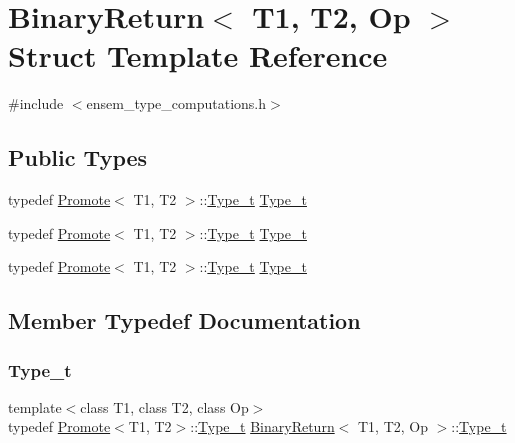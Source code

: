 \hypertarget{structBinaryReturn}{}\section{Binary\+Return$<$ T1, T2, Op $>$ Struct Template Reference}
\label{structBinaryReturn}


{\ttfamily \#include $<$ensem\+\_\+type\+\_\+computations.\+h$>$}

\subsection*{Public Types}
\begin{DoxyCompactItemize}
\item 
typedef \mbox{\hyperlink{structPromote}{Promote}}$<$ T1, T2 $>$\+::\mbox{\hyperlink{structBinaryReturn_a77ba8984fbe3ead3c145da225432d208}{Type\+\_\+t}} \mbox{\hyperlink{structBinaryReturn_a77ba8984fbe3ead3c145da225432d208}{Type\+\_\+t}}
\item 
typedef \mbox{\hyperlink{structPromote}{Promote}}$<$ T1, T2 $>$\+::\mbox{\hyperlink{structBinaryReturn_a77ba8984fbe3ead3c145da225432d208}{Type\+\_\+t}} \mbox{\hyperlink{structBinaryReturn_a77ba8984fbe3ead3c145da225432d208}{Type\+\_\+t}}
\item 
typedef \mbox{\hyperlink{structPromote}{Promote}}$<$ T1, T2 $>$\+::\mbox{\hyperlink{structBinaryReturn_a77ba8984fbe3ead3c145da225432d208}{Type\+\_\+t}} \mbox{\hyperlink{structBinaryReturn_a77ba8984fbe3ead3c145da225432d208}{Type\+\_\+t}}
\end{DoxyCompactItemize}


\subsection{Member Typedef Documentation}
\mbox{\label{structBinaryReturn_a77ba8984fbe3ead3c145da225432d208}} 
\subsubsection{\texorpdfstring{Type\_t}{Type\_t}\hspace{0.1cm}{\footnotesize\ttfamily [1/3]}}
{\footnotesize\ttfamily template$<$class T1, class T2, class Op$>$ \\
typedef \mbox{\hyperlink{structPromote}{Promote}}$<$T1, T2$>$\+::\mbox{\hyperlink{structBinaryReturn_a77ba8984fbe3ead3c145da225432d208}{Type\+\_\+t}} \mbox{\hyperlink{structBinaryReturn}{Binary\+Return}}$<$ T1, T2, Op $>$\+::\mbox{\hyperlink{structBinaryReturn_a77ba8984fbe3ead3c145da225432d208}{Type\+\_\+t}}}

